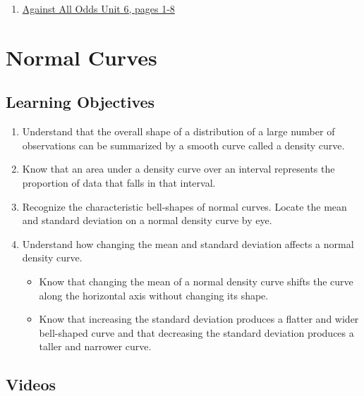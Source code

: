 \documentclass[letterpaper,9pt,twocolumn,twoside,printwatermark=false]{pinp}
\providecommand{\tightlist}{%
  \setlength{\itemsep}{0pt}\setlength{\parskip}{0pt}}
\begin{document}
\begin{enumerate}
\item \href{https://www.learner.org/courses/againstallodds/pdfs/AgainstAllOdds_StudentGuide_Unit06.pdf#page=1}{Against All Odds Unit 6, pages 1-8}
\end{enumerate}

\hypertarget{normal-curves}{%
\section{Normal Curves}\label{normal-curves}}

\hypertarget{learning-objectives-2}{%
\subsection{Learning Objectives}\label{learning-objectives-2}}

\begin{enumerate}
\def\labelenumi{\arabic{enumi}.}
\tightlist
\item
  Understand that the overall shape of a distribution of a large number
  of observations can be summarized by a smooth curve called a density
  curve.
\item
  Know that an area under a density curve over an interval represents
  the proportion of data that falls in that interval.
\item
  Recognize the characteristic bell-shapes of normal curves. Locate the
  mean and standard deviation on a normal density curve by eye.
\item
  Understand how changing the mean and standard deviation affects a
  normal density curve.

  \begin{itemize}
  \tightlist
  \item
    Know that changing the mean of a normal density curve shifts the
    curve along the horizontal axis without changing its shape.
  \item
    Know that increasing the standard deviation produces a flatter and
    wider bell-shaped curve and that decreasing the standard deviation
    produces a taller and narrower curve.
  \end{itemize}
\end{enumerate}

\hypertarget{videos-2}{%
\subsection{Videos}\label{videos-2}}
\end{document}
